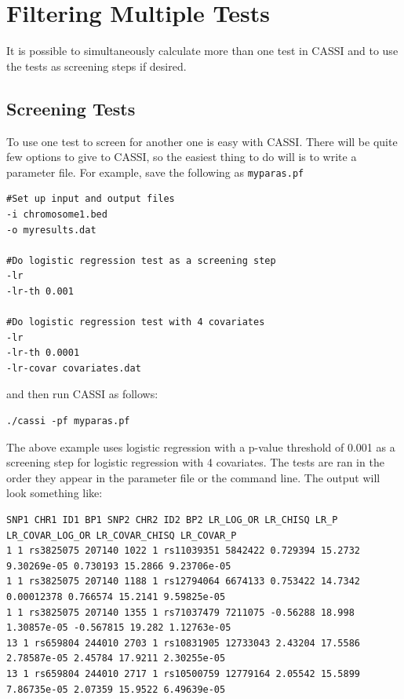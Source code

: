\documentclass[a4paper,12pt]{article}
\newcommand{\code}[1]{{\footnotesize{{\tt #1}}}}
\begin{document}
\section{Filtering Multiple Tests}
\label{multiple-tests}

It is possible to simultaneously calculate more than one test in CASSI and to use the tests as screening steps if desired. 
\subsection{Screening Tests}
\label{screening}

To use one test to screen for another one is easy with CASSI. There will be quite few options to give to CASSI, so the easiest thing to do will is to write a parameter file. For example, save the following as \code{myparas.pf} 
\vspace{0.35cm} \begin{lstlisting}
#Set up input and output files
-i chromosome1.bed
-o myresults.dat

#Do logistic regression test as a screening step
-lr
-lr-th 0.001

#Do logistic regression test with 4 covariates
-lr
-lr-th 0.0001
-lr-covar covariates.dat

\end{lstlisting} \vspace{0.35cm}
and then run CASSI as follows: 
\vspace{0.35cm} \begin{lstlisting}
./cassi -pf myparas.pf

\end{lstlisting} \vspace{0.35cm}
The above example uses logistic regression with a p-value threshold of 0.001 as a screening step for logistic regression with 4 covariates. The tests are ran in the order they appear in the parameter file or the command line. The output will look something like: 
\vspace{0.35cm} \begin{lstlisting}
SNP1 CHR1 ID1 BP1 SNP2 CHR2 ID2 BP2 LR_LOG_OR LR_CHISQ LR_P LR_COVAR_LOG_OR LR_COVAR_CHISQ LR_COVAR_P
1 1 rs3825075 207140 1022 1 rs11039351 5842422 0.729394 15.2732 9.30269e-05 0.730193 15.2866 9.23706e-05
1 1 rs3825075 207140 1188 1 rs12794064 6674133 0.753422 14.7342 0.00012378 0.766574 15.2141 9.59825e-05
1 1 rs3825075 207140 1355 1 rs71037479 7211075 -0.56288 18.998 1.30857e-05 -0.567815 19.282 1.12763e-05
13 1 rs659804 244010 2703 1 rs10831905 12733043 2.43204 17.5586 2.78587e-05 2.45784 17.9211 2.30255e-05
13 1 rs659804 244010 2717 1 rs10500759 12779164 2.05542 15.5899 7.86735e-05 2.07359 15.9522 6.49639e-05

\end{lstlisting} \vspace{0.35cm}
\end{document}
